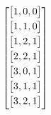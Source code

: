 \documentclass{article}
\begin{document}
\begin{center}
\[
\begin{bmatrix}
\vspace{1mm}
\begin{bmatrix}
 1, 0, 0 \\
 \end{bmatrix} \\
\vspace{1mm}
 \begin{bmatrix}
 1,1,0 \\ 
 \end{bmatrix} \\
\vspace{1mm}
 \begin{bmatrix}
 1,2,1 \\ 
 \end{bmatrix} \\
\vspace{1mm}
 \begin{bmatrix}
 2,2,1 \\ 
 \end{bmatrix} \\
\vspace{1mm}
 \begin{bmatrix}
 3,0,1 \\
 \end{bmatrix} \\
\vspace{1mm}
 \begin{bmatrix}
 3,1,1 \\
 \end{bmatrix} \\
\vspace{1mm}
 \begin{bmatrix}
 3,2,1 \\
\end{bmatrix} \\
\end{bmatrix}
\]
\end{center}
\end{document}

